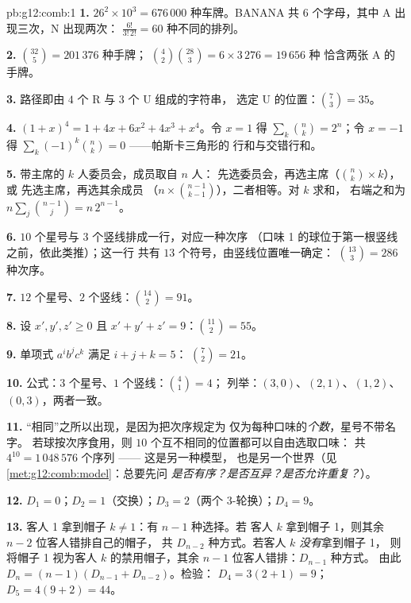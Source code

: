 \begin{solution}{pb:g12:comb:1}
\textbf{1.} $26^2 \times 10^3 = 676\,000$ 种车牌。BANANA 共 $6$
个字母，其中 A 出现三次，N 出现两次：
$\frac{6!}{3!\,2!} = 60$ 种不同的排列。

\textbf{2.} $\binom{32}{5} = 201\,376$ 种手牌；
$\binom42 \binom{28}{3} = 6 \times 3\,276 = 19\,656$ 种
恰含两张 A 的手牌。

\textbf{3.} 路径即由 $4$ 个 R 与 $3$ 个 U 组成的字符串，
选定 U 的位置：$\binom73 = 35$。

\textbf{4.} $(1+x)^4 = 1 + 4x + 6x^2 + 4x^3 + x^4$。令
$x = 1$ 得 $\sum_k \binom nk = 2^n$；令 $x = -1$ 得
$\sum_k (-1)^k \binom nk = 0$ ——帕斯卡三角形的
行和与交错行和。

\textbf{5.} 带主席的 $k$ 人委员会，成员取自 $n$ 人：
先选委员会，再选主席（$\binom nk \times k$），或
先选主席，再选其余成员
（$n \times \binom{n-1}{k-1}$），二者相等。对 $k$ 求和，
右端之和为 $n \sum_j \binom{n-1}{j} = n\,2^{n-1}$。

\textbf{6.} $10$ 个星号与 $3$ 个竖线排成一行，对应一种次序
（口味 1 的球位于第一根竖线之前，依此类推）；这一行
共有 $13$ 个符号，由竖线位置唯一确定：
$\binom{13}{3} = 286$ 种次序。

\textbf{7.} $12$ 个星号、$2$ 个竖线：$\binom{14}{2} = 91$。

\textbf{8.} 设 $x', y', z' \geq 0$ 且
$x' + y' + z' = 9$：$\binom{11}{2} = 55$。

\textbf{9.} 单项式 $a^i b^j c^k$ 满足 $i + j + k = 5$：
$\binom72 = 21$。

\textbf{10.} 公式：$3$ 个星号、$1$ 个竖线：$\binom41 = 4$；
列举：$(3,0)$、$(2,1)$、$(1,2)$、$(0,3)$，两者一致。

\textbf{11.} “相同”之所以出现，是因为把次序规定为
仅为每种口味的\emph{个数}，星号不带名字。
若球按次序食用，则
$10$ 个互不相同的位置都可以自由选取口味：
共 $4^{10} = 1\,048\,576$ 个序列 —— 这是另一种模型，
也是另一个世界（见\cref{met:g12:comb:model}：总要先问
\emph{是否有序？是否互异？是否允许重复？}）。

\textbf{12.} $D_1 = 0$；$D_2 = 1$（交换）；$D_3 = 2$（两个
$3$-轮换）；$D_4 = 9$。

\textbf{13.} 客人 1 拿到帽子 $k \neq 1$：有 $n - 1$ 种选择。若
客人 $k$ 拿到帽子 1，则其余 $n - 2$ 位客人错排自己的帽子，
共 $D_{n-2}$ 种方式。若客人 $k$ \emph{没有}拿到帽子 1，
则将帽子 1 视为客人 $k$ 的禁用帽子，其余
$n - 1$ 位客人错排：$D_{n-1}$ 种方式。
由此 $D_n = (n-1)(D_{n-1} + D_{n-2})$。检验：
$D_4 = 3(2 + 1) = 9$；$D_5 = 4(9 + 2) = 44$。


\end{solution}
